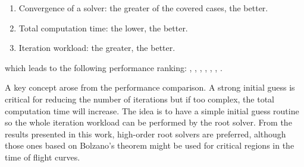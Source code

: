\begin{enumerate}
  \item Convergence of a solver: the greater of the covered cases, the better.
  \item Total computation time: the lower, the better.
  \item Iteration workload: the greater, the better.
\end{enumerate}

which leads to the following performance ranking: \cite{izzo2015},
\cite{arora2013}, \cite{gooding1990}, \cite{battin1984}, \cite{avanzini2008},
\cite{vallado2013}, \cite{gauss1809}.

A key concept arose from the performance comparison. A strong initial guess
is critical for reducing the number of iterations but if too complex, the total
computation time will increase. The idea is to have a simple initial guess
routine so the whole iteration workload can be performed by the root solver.
From the results presented in this work, high-order root solvers are preferred,
although those ones based on Bolzano's theorem might be used for critical
regions in the time of flight curves.
